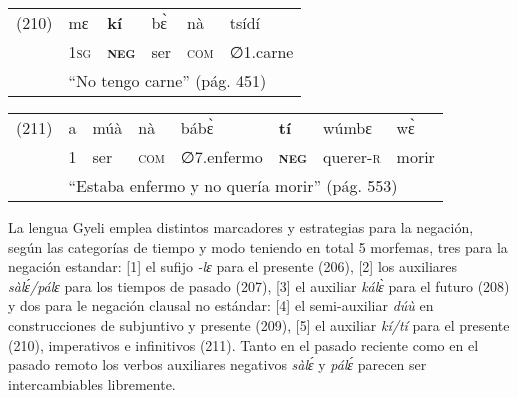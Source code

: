 {%
\begin{tabular}{llllll}
(210) & mɛ & \textbf{kí} & bɛ̀ & nà & tsídí \\
& \textsc{1sg} & \textsc{\textbf{neg}} & ser & \textsc{com} & \textsc{∅1.}carne \\
& \multicolumn{5}{l}{``No tengo carne'' (pág. 451)}
\end{tabular} \vspace{0.3cm}

\begin{tabular}{llllllll}
(211) & a & múà & nà & bábɛ̀ & \textbf{tí} & wúmbɛ & wɛ̀ \\
& 1 & ser & \textsc{com} & \textsc{∅7.}enfermo & \textsc{\textbf{neg}} & querer-\textsc{r} & morir \\
& \multicolumn{7}{l}{``Estaba enfermo y no quería morir'' (pág. 553)}
\end{tabular} \vspace{0.5cm}

}

La lengua Gyeli emplea distintos marcadores y estrategias para la negación, según las categorías de tiempo y modo \textcolor{MidnightBlue}{\citep{gyeli}} teniendo en total 5 morfemas, tres para la negación estandar: [1] el sufijo {\setmainfont{Charis SIL} \textit{-lɛ}} para el presente (206), [2] los auxiliares {\setmainfont{Charis SIL} \textit{sàlɛ́/pálɛ}} para los tiempos de pasado (207), [3] el auxiliar {\setmainfont{Charis SIL} \textit{kálɛ̀}} para el futuro (208) y dos para le negación clausal no estándar: [4] el semi-auxiliar {\setmainfont{Charis SIL} \textit{dúù}} en construcciones de subjuntivo y presente (209), [5] el auxiliar {\setmainfont{Charis SIL} \textit{kí/tí}} para el presente (210), imperativos e infinitivos (211). Tanto en el pasado reciente como en el pasado remoto los verbos auxiliares negativos {\setmainfont{Charis SIL} \textit{sàlɛ́}} y {\setmainfont{Charis SIL} \textit{pálɛ́}} parecen ser intercambiables libremente.